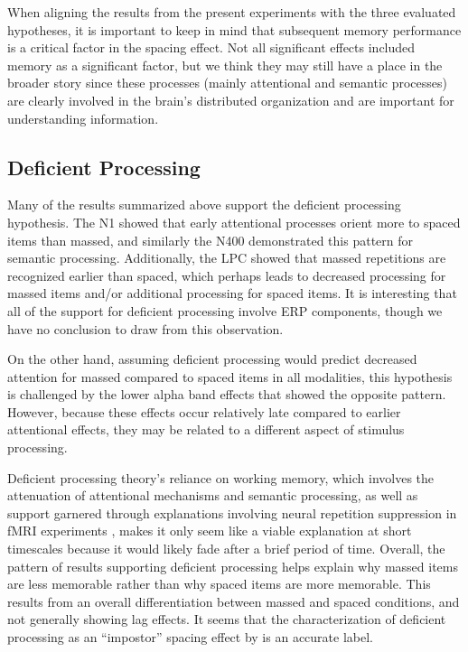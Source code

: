 
When aligning the results from the present experiments with the three evaluated hypotheses, it is important to keep in mind that subsequent memory performance is a critical factor in the spacing effect.  Not all significant effects included memory as a significant factor, but we think they may still have a place in the broader story since these processes (mainly attentional and semantic processes) are clearly involved in the brain's distributed organization and are important for understanding information.

\subsection{Deficient Processing}

Many of the results summarized above support the deficient processing hypothesis.  The N1 showed that early attentional processes orient more to spaced items than massed, and similarly the N400 demonstrated this pattern for semantic processing.  Additionally, the LPC showed that massed repetitions are recognized earlier than spaced, which perhaps leads to decreased processing for massed items and/or additional processing for spaced items.  It is interesting that all of the support for deficient processing involve ERP components, though we have no conclusion to draw from this observation.

On the other hand, assuming deficient processing would predict decreased attention for massed compared to spaced items in all modalities, this hypothesis is challenged by the lower alpha band effects that showed the opposite pattern.  However, because these effects occur relatively late compared to earlier attentional effects, they may be related to a different aspect of stimulus processing.

Deficient processing theory's reliance on working memory, which involves the attenuation of attentional mechanisms and semantic processing, as well as support garnered through explanations involving neural repetition suppression in fMRI experiments \cite{CallSchw2010,XueEtal2011}, makes it only seem like a viable explanation at short timescales because it would likely fade after a brief period of time.
Overall, the pattern of results supporting deficient processing helps explain why massed items are less memorable rather than why spaced items are more memorable.  This results from an overall differentiation between massed and spaced conditions, and not generally showing lag effects.
It seems that the characterization of deficient processing as an ``impostor'' spacing effect by  is an accurate label.

